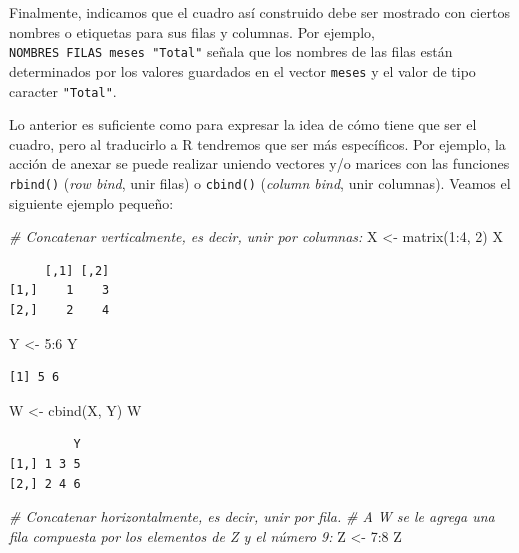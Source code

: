 \documentclass[
]{book}
\newenvironment{Shaded}{\begin{snugshade}}{\end{snugshade}}
\newcommand{\CommentTok}[1]{\textcolor[rgb]{0.56,0.35,0.01}{\textit{#1}}}
\newcommand{\DecValTok}[1]{\textcolor[rgb]{0.00,0.00,0.81}{#1}}
\newcommand{\FunctionTok}[1]{\textcolor[rgb]{0.00,0.00,0.00}{#1}}
\newcommand{\NormalTok}[1]{#1}
\newcommand{\OtherTok}[1]{\textcolor[rgb]{0.56,0.35,0.01}{#1}}
\newcommand{\SpecialCharTok}[1]{\textcolor[rgb]{0.00,0.00,0.00}{#1}}
\begin{document}
Finalmente, indicamos que el cuadro así construido debe ser mostrado con ciertos nombres o etiquetas para sus filas y columnas. Por ejemplo, \texttt{NOMBRES\ FILAS\ meses\ "Total"} señala que los nombres de las filas están determinados por los valores guardados en el vector \texttt{meses} y el valor de tipo caracter \texttt{"Total"}.

Lo anterior es suficiente como para expresar la idea de cómo tiene que ser el cuadro, pero al traducirlo a R tendremos que ser más específicos. Por ejemplo, la acción de anexar se puede realizar uniendo vectores y/o marices con las funciones \texttt{rbind()} (\emph{row bind}, unir filas) o \texttt{cbind()} (\emph{column bind}, unir columnas). Veamos el siguiente ejemplo pequeño:

\begin{Shaded}
\begin{Highlighting}[]
\CommentTok{\# Concatenar verticalmente, es decir, unir por columnas:}
\NormalTok{X }\OtherTok{\textless{}{-}} \FunctionTok{matrix}\NormalTok{(}\DecValTok{1}\SpecialCharTok{:}\DecValTok{4}\NormalTok{, }\DecValTok{2}\NormalTok{)}
\NormalTok{X}
\end{Highlighting}
\end{Shaded}

\begin{verbatim}
     [,1] [,2]
[1,]    1    3
[2,]    2    4
\end{verbatim}

\begin{Shaded}
\begin{Highlighting}[]
\NormalTok{Y }\OtherTok{\textless{}{-}} \DecValTok{5}\SpecialCharTok{:}\DecValTok{6}
\NormalTok{Y}
\end{Highlighting}
\end{Shaded}

\begin{verbatim}
[1] 5 6
\end{verbatim}

\begin{Shaded}
\begin{Highlighting}[]
\NormalTok{W }\OtherTok{\textless{}{-}} \FunctionTok{cbind}\NormalTok{(X, Y)}
\NormalTok{W}
\end{Highlighting}
\end{Shaded}

\begin{verbatim}
         Y
[1,] 1 3 5
[2,] 2 4 6
\end{verbatim}

\begin{Shaded}
\begin{Highlighting}[]
\CommentTok{\# Concatenar horizontalmente, es decir, unir por fila. }
\CommentTok{\# A W se le agrega una fila compuesta por los elementos de Z y el número 9:}
\NormalTok{Z }\OtherTok{\textless{}{-}} \DecValTok{7}\SpecialCharTok{:}\DecValTok{8}
\NormalTok{Z}
\end{Highlighting}
\end{Shaded}
\end{document}
